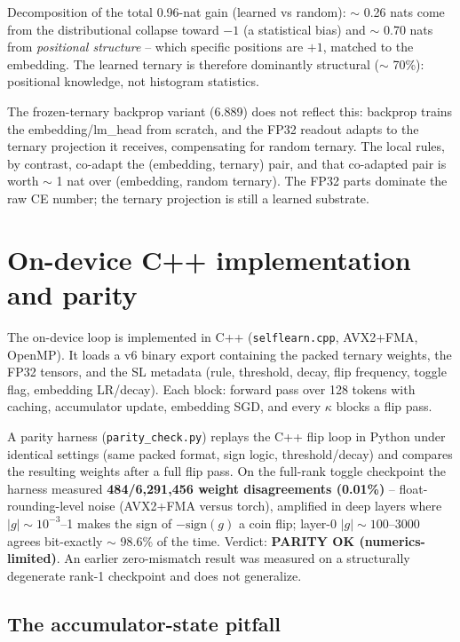 \documentclass{article} %
\begin{document}
Decomposition of the total 0.96-nat gain (learned vs random): $\sim$ 0.26 nats come from the distributional collapse toward $-1$ (a statistical bias) and $\sim$ 0.70 nats from \emph{positional structure} -- which specific positions are $+1$, matched to the embedding. The learned ternary is therefore dominantly structural ($\sim$ 70\%): positional knowledge, not histogram statistics.

The frozen-ternary backprop variant (6.889) does not reflect this: backprop trains the embedding/lm\_head from scratch, and the FP32 readout adapts to the ternary projection it receives, compensating for random ternary. The local rules, by contrast, co-adapt the (embedding, ternary) pair, and that co-adapted pair is worth $\sim$ 1 nat over (embedding, random ternary). The FP32 parts dominate the raw CE number; the ternary projection is still a learned substrate.

\section{On-device C++ implementation and parity}
\label{sec:ondevice}

The on-device loop is implemented in C++ (\texttt{selflearn.cpp}, AVX2+FMA, OpenMP). It loads a v6 binary export containing the packed ternary weights, the FP32 tensors, and the SL metadata (rule, threshold, decay, flip frequency, toggle flag, embedding LR/decay). Each block: forward pass over 128 tokens with caching, accumulator update, embedding SGD, and every $\kappa$ blocks a flip pass.

A parity harness (\texttt{parity\_check.py}) replays the C++ flip loop in Python under identical settings (same packed format, sign logic, threshold/decay) and compares the resulting weights after a full flip pass. On the full-rank toggle checkpoint the harness measured \textbf{484/6,291,456 weight disagreements (0.01\%)} -- float-rounding-level noise (AVX2+FMA versus torch), amplified in deep layers where $|g|\sim10^{-3}$--1 makes the sign of $-\text{sign}(g)$ a coin flip; layer-0 $|g|\sim100$--3000 agrees bit-exactly $\sim$ 98.6\% of the time. Verdict: \textbf{PARITY OK (numerics-limited)}. An earlier zero-mismatch result was measured on a structurally degenerate rank-1 checkpoint and does not generalize.

\subsection{The accumulator-state pitfall}
\label{sec:accpitfall}
\end{document}

